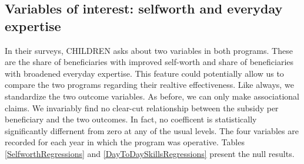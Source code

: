 \documentclass[12pt, a4paper, titlepage]{article}\usepackage[]{graphicx}\usepackage[]{color}
\begin{document}
\subsection{Variables of interest: selfworth and everyday expertise} 

In their surveys, CHILDREN asks about two variables in both programs. These are the share of beneficiaries with improved self-worth and share of beneficiaries with broadened everyday expertise. This feature could potentially allow us to compare the two programs regarding their realtive effectiveness. Like always, we standardize the two outcome variables. As before, we can only make associational claims. We invariably find no clear-cut relationship between the subsidy per beneficiary and the two outcomes. In fact, no coefficent is statistically significantly differnent from zero at any of the usual levels. 
The four variables are recorded for each year in which the program was operative.
Tables \ref{SelfworthRegressions} and \ref{DayToDaySkillsRegressions} present the null results. 
\end{document}
